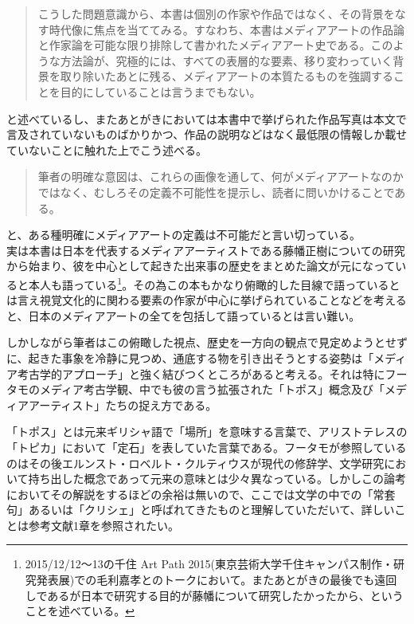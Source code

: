 \documentclass[a4paper,report]{jsbook}
\begin{document}
\begin{quote}
こうした問題意識から、本書は個別の作家や作品ではなく、その背景をなす時代像に焦点を当ててみる。すなわち、本書はメディアアートの作品論と作家論を可能な限り排除して書かれたメディアアート史である。このような方法論が、究極的には、すべての表層的な要素、移り変わっていく背景を取り除いたあとに残る、メディアアートの本質たるものを強調することを目的にしていることは言うまでもない。
\end{quote}

と述べているし、またあとがきにおいては本書中で挙げられた作品写真は本文で言及されていないものばかりかつ、作品の説明などはなく最低限の情報しか載せていないことに触れた上でこう述べる。

\begin{quote}
筆者の明確な意図は、これらの画像を通して、何がメディアアートなのかではなく、むしろその定義不可能性を提示し、読者に問いかけることである。
\end{quote}

と、ある種明確にメディアアートの定義は不可能だと言い切っている。\\
実は本書は日本を代表するメディアアーティストである藤幡正樹についての研究から始まり、彼を中心として起きた出来事の歴史をまとめた論文が元になっていると本人も語っている\footnote{2015/12/12〜13の千住
  Art Path
  2015(東京芸術大学千住キャンパス制作・研究発表展)での毛利嘉孝とのトークにおいて。またあとがきの最後でも遠回しであるが日本で研究する目的が藤幡について研究したかったから、ということを述べている。}。その為この本もかなり俯瞰的した目線で語っているとは言え視覚文化的に関わる要素の作家が中心に挙げられていることなどを考えると、日本のメディアアートの全てを包括して語っているとは言い難い。

しかしながら筆者はこの俯瞰した視点、歴史を一方向の観点で見定めようとせずに、起きた事象を冷静に見つめ、通底する物を引き出そうとする姿勢は「メディア考古学的アプローチ」と強く結びつくところがあると考える。それは特にフータモのメディア考古学観、中でも彼の言う拡張された「トポス」概念及び「メディアアーティスト」たちの捉え方である。

「トポス」とは元来ギリシャ語で「場所」を意味する言葉で、アリストテレスの「トピカ」において「定石」を表していた言葉である。フータモが参照しているのはその後エルンスト・ロベルト・クルティウスが現代の修辞学、文学研究において持ち出した概念であって元来の意味とは少々異なっている。しかしこの論考においてその解説をするほどの余裕は無いので、ここでは文学の中での「常套句」あるいは「クリシェ」と呼ばれてきたものと理解していただいて、詳しいことは参考文献\autocite{huhtamo:mediaarcheology}1章を参照されたい。
\end{document}
